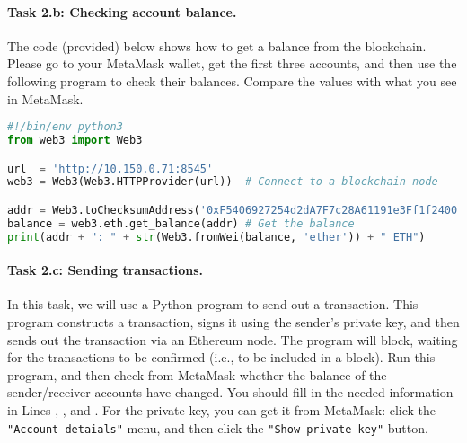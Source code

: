 \paragraph{Task 2.b: Checking account balance.} 
The code (provided) below shows how to get a balance from the blockchain.
Please go to your MetaMask wallet, get the first three accounts,
and then use the following program to check their balances.
Compare the values with what you see in MetaMask. 

\begin{lstlisting}[caption=Get balance (\texttt{web3\_balance.py}), language=python] 
#!/bin/env python3
from web3 import Web3

url  = 'http://10.150.0.71:8545'
web3 = Web3(Web3.HTTPProvider(url))  # Connect to a blockchain node

addr = Web3.toChecksumAddress('0xF5406927254d2dA7F7c28A61191e3Ff1f2400fe9')
balance = web3.eth.get_balance(addr) # Get the balance 
print(addr + ": " + str(Web3.fromWei(balance, 'ether')) + " ETH")
\end{lstlisting}
 

\paragraph{Task 2.c: Sending transactions.} 
In this task, we will use a Python program to send out a transaction. 
This program constructs a transaction, signs it using the sender's
private key, and then sends out the transaction via an Ethereum node.
The program will block, waiting for the transactions to be 
confirmed (i.e., to be included in a block). Run this program,
and then check from MetaMask whether the balance of the sender/receiver
accounts have changed. You should fill in the needed information
in Lines \lineone, \linetwo, and \linethree. For the private key,
you can get it from MetaMask: click the \texttt{"Account detaials"}
menu, and then click the \texttt{"Show private key"} button.


